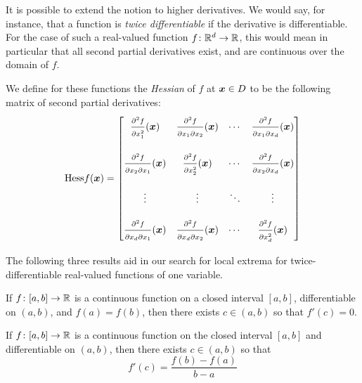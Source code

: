 It is possible to extend the notion to higher derivatives.  We would say, for instance, that a function is \emph{twice differentiable} if the derivative is differentiable.  For the case of such a real-valued function $f \colon \mathbb{R}^d \to \mathbb{R}$, this would mean in particular that all second partial derivatives exist, and are continuous over the domain of $f$.

We define for these functions the \emph{Hessian} of $f$ at $\boldsymbol{x} \in D$ to be the following matrix of second partial derivatives:
\begin{equation*}
\mathop{\mathrm{Hess}{f}}(\boldsymbol{x}) = \begin{bmatrix}
\frac{\strut\partial^2 f}{\strut\partial x_1^2}(\boldsymbol{x}) & \frac{\strut\partial^2 f}{\strut\partial x_1 \partial x_2}(\boldsymbol{x}) &\dotsb &\frac{\strut\partial^2 f}{\strut\partial x_1 \partial x_d}(\boldsymbol{x}) \\
&&&\\
\frac{\strut\partial^2 f}{\strut\partial x_2 \partial x_1}(\boldsymbol{x}) & \frac{\strut\partial^2 f}{\strut\partial x_2^2}(\boldsymbol{x}) &\dotsb &\frac{\strut\partial^2 f}{\strut\partial x_2 \partial x_d}(\boldsymbol{x}) \\
&&& \\
\vdots & \vdots &\ddots &\vdots \\
&&& \\
\frac{\strut\partial^2 f}{\strut\partial x_d \partial x_1}(\boldsymbol{x}) & \frac{\strut\partial^2 f}{\strut\partial x_d \partial x_2}(\boldsymbol{x}) &\dotsb &\frac{\strut\partial^2 f}{\strut\partial x_d^2}(\boldsymbol{x})
\end{bmatrix}
\end{equation*}

The following three results aid in our search for local extrema for twice-differentiable real-valued functions of one variable.

\begin{theorem}\label{theorem:Rolle}
If $f\colon [a,b] \to \mathbb{R}$ is a continuous function on a closed interval $[a,b]$, differentiable on $(a,b)$, and $f(a) = f(b)$, then there exists $c \in (a,b)$ so that $f'(c)=0$.
\end{theorem}

\begin{theorem}\label{theorem:MVT}
If $f\colon [a,b] \to \mathbb{R}$ is a continuous function on the closed interval $[a,b]$ and differentiable on $(a,b)$, then there exists $c \in (a,b)$ so that
\begin{equation*}
f'(c) = \frac{f(b)-f(a)}{b-a}
\end{equation*}
\end{theorem}

